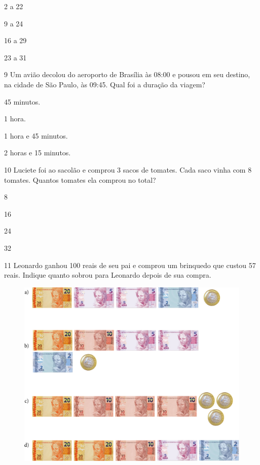 \begin{escolha}[itemsep=-5pt]
\item 2 a 22

\item 9 a 24

\item 16 a 29

\item 23 a 31
\end{escolha}

\num{9} Um avião decolou do aeroporto de Brasília às 08:00 e pousou em seu
destino, na cidade de São Paulo, às 09:45. Qual foi a duração da viagem?

\begin{escolha}[itemsep=-5pt]
\item 45 minutos.

\item 1 hora.

\item 1 hora e 45 minutos.

\item 2 horas e 15 minutos.
\end{escolha}

\num{10} Luciete foi ao sacolão e comprou 3 sacos de tomates. Cada saco vinha com
8 tomates. Quantos tomates ela comprou no total?

\begin{escolha}[itemsep=-5pt]
\begin{multicols}{2}
\item 8

\item 16

\item 24

\item 32
\end{multicols}
\end{escolha}

\num{11} Leonardo ganhou 100 reais de seu pai e comprou um brinquedo que custou
57 reais. Indique quanto sobrou para Leonardo depois de sua compra.

\begin{figure}[H]
\includegraphics[width=\textwidth]{./media/image131.png}
\end{figure}

